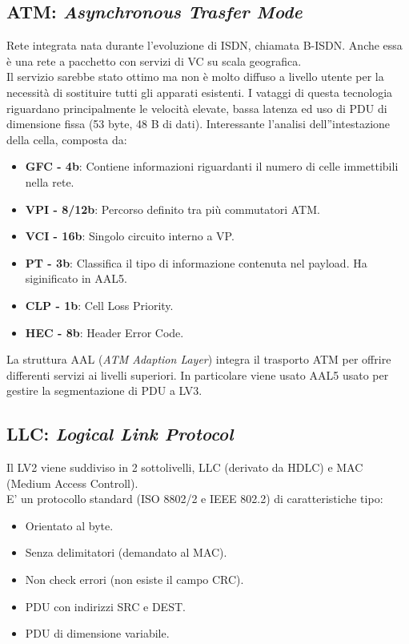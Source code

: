 \documentclass[12pt]{article}
\begin{document}
\subsection{ATM: \textit{Asynchronous Trasfer Mode}}
Rete integrata nata durante l'evoluzione di ISDN, chiamata B-ISDN. Anche essa è una rete a pacchetto con servizi di VC su scala geografica.\\
 Il servizio sarebbe stato ottimo ma non è molto diffuso a livello utente per la necessità di sostituire tutti gli apparati esistenti. I vataggi di questa tecnologia riguardano principalmente le velocità elevate, bassa latenza ed uso di PDU di dimensione fissa (53 byte, 48 B di dati). Interessante l'analisi dell''intestazione della cella, composta da:
 \begin{itemize}
   \item \textbf{GFC - 4b}: Contiene informazioni riguardanti il numero di celle immettibili nella rete.
   \item \textbf{VPI - 8/12b}: Percorso definito tra più commutatori ATM.
   \item \textbf{VCI - 16b}: Singolo circuito interno a VP.
   \item \textbf{PT - 3b}: Classifica il tipo di informazione contenuta nel payload. Ha siginificato in AAL5.
   \item \textbf{CLP - 1b}: Cell Loss Priority.
   \item \textbf{HEC - 8b}: Header Error Code.
 \end{itemize}
La struttura AAL (\textit{ATM Adaption Layer}) integra il trasporto ATM per offrire differenti servizi ai livelli superiori. In particolare viene usato AAL5 usato per gestire la segmentazione di PDU a LV3.

\subsection{LLC: \textit{Logical Link Protocol}}
Il LV2 viene suddiviso in 2 sottolivelli, LLC (derivato da HDLC) e MAC (Medium Access Controll).\\
E' un protocollo standard (ISO 8802/2 e IEEE 802.2) di caratteristiche tipo:
\begin{itemize}
  \item Orientato al byte.
  \item Senza delimitatori (demandato al MAC).
  \item Non check errori (non esiste il campo CRC).
  \item PDU con indirizzi SRC e DEST.
  \item PDU di dimensione variabile.
\end{itemize}
\end{document}

